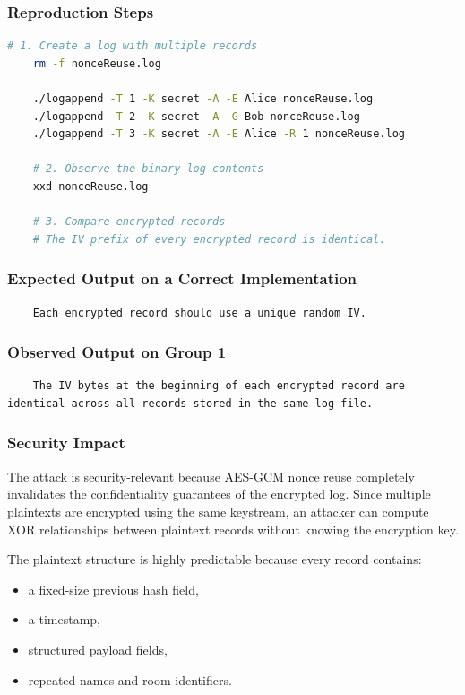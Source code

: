 \documentclass[a4paper, 12pt]{article}
\begin{document}
    \subsubsection{Reproduction Steps}
    \begin{lstlisting}[language=bash]
    # 1. Create a log with multiple records
    rm -f nonceReuse.log

    ./logappend -T 1 -K secret -A -E Alice nonceReuse.log
    ./logappend -T 2 -K secret -A -G Bob nonceReuse.log
    ./logappend -T 3 -K secret -A -E Alice -R 1 nonceReuse.log

    # 2. Observe the binary log contents
    xxd nonceReuse.log

    # 3. Compare encrypted records
    # The IV prefix of every encrypted record is identical.
    \end{lstlisting}

    \subsubsection{Expected Output on a Correct Implementation}
    \begin{lstlisting}
    Each encrypted record should use a unique random IV.
    \end{lstlisting}

    \subsubsection{Observed Output on Group 1}
    \begin{lstlisting}
    The IV bytes at the beginning of each encrypted record are identical across all records stored in the same log file.
    \end{lstlisting}

    \subsubsection{Security Impact}
    The attack is security-relevant because AES-GCM nonce reuse completely invalidates the confidentiality guarantees of the encrypted log. Since multiple plaintexts are encrypted using the same keystream, an attacker can compute XOR relationships between plaintext records without knowing the encryption key.

    The plaintext structure is highly predictable because every record contains:
    \begin{itemize}
        \item a fixed-size previous hash field,
        \item a timestamp,
        \item structured payload fields,
        \item repeated names and room identifiers.
    \end{itemize}
\end{document}
